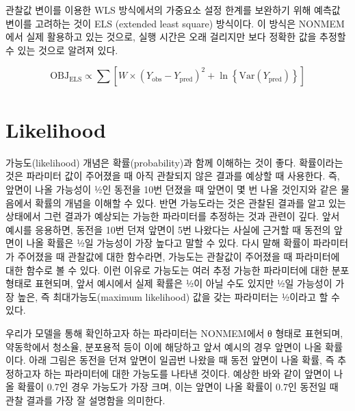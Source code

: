 \documentclass[
  10pt,
]{krantz}
\begin{document}
관찰값 변이를 이용한 WLS 방식에서의 가중요소 설정 한계를 보완하기 위해 예측값 변이를 고려하는 것이 ELS (extended
least square) 방식이다. 이 방식은 NONMEM에서 실제 활용하고 있는 것으로, 실행 시간은 오래 걸리지만 보다 정확한
값을 추정할 수 있는 것으로 알려져 있다.

\[\text{OBJ}_{\text{ELS}} \propto \sum_{}^{}\left\lbrack W \times {(Y_{\text{obs}} - Y_{\text{pred}})}^{2} + \ln\left\{ \text{Var}\left( Y_{\text{pred}} \right) \right\} \right\rbrack\]

\hypertarget{likelihood}{%
\section{Likelihood}\label{likelihood}}

가능도(likelihood) 개념은 확률(probability)과 함께 이해하는 것이 좋다. 확률이라는 것은 파라미터 값이
주어졌을 때 아직 관찰되지 않은 결과를 예상할 때 사용한다. 즉, 앞면이 나올 가능성이 ½인 동전을 10번 던졌을
때 앞면이 몇 번 나올 것인지와 같은 물음에서 확률의 개념을 이해할 수 있다. 반면 가능도라는 것은 관찰된 결과를 알고 있는
상태에서 그런 결과가 예상되는 가능한 파라미터를 추정하는 것과 관련이 깊다. 앞서 예시를 응용하면, 동전을 10번 던져 앞면이
5번 나왔다는 사실에 근거할 때 동전의 앞면이 나올 확률은 ½일 가능성이 가장 높다고 말할 수 있다. 다시 말해 확률이 파라미터가
주어졌을 때 관찰값에 대한 함수라면, 가능도는 관찰값이 주어졌을 때 파라미터에 대한 함수로 볼 수 있다. 이런 이유로 가능도는
여러 추정 가능한 파라미터에 대한 분포 형태로 표현되며, 앞서 예시에서 실제 확률은 ½이 아닐 수도 있지만 ½일 가능성이
가장 높은, 즉 최대가능도(maximum likelihood) 값을 갖는 파라미터는 ½이라고 할 수 있다.

우리가 모델을 통해 확인하고자 하는 파라미터는 NONMEM에서 θ 형태로 표현되며, 약동학에서 청소율, 분포용적 등이 이에
해당하고 앞서 예시의 경우 앞면이 나올 확률이다. 아래 그림은 동전을 던져 앞면이 일곱번 나왔을 때 동전 앞면이
나올 확률, 즉 추정하고자 하는 파라미터에 대한 가능도를 나타낸 것이다. 예상한 바와 같이 앞면이 나올 확률이 0.7인
경우 가능도가 가장 크며, 이는 앞면이 나올 확률이 0.7인 동전일 때 관찰 결과를 가장 잘 설명함을 의미한다.
\end{document}

